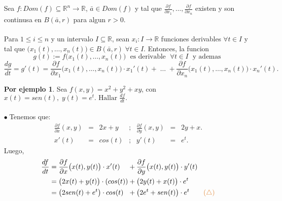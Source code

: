 \documentclass{article}
\theoremstyle{definition}
\newtheorem*{ej}{Por ejemplo}
\theoremstyle{remark}
\newcommand\bl{$\bullet\;$}
\begin{document}
\begin{teo}
  Sea $f : Dom(f) \subseteq \mathbb{R}^n \to \mathbb{R}$, $\bar{a} \in Dom(f)$ y tal que $\frac{\partial f}{\partial x_1},\dots,\frac{\partial f}{\partial x_n}$ existen y son continusa en $B(\bar{a},r)$ para algun $r>0$.\\\\
  Para $1 \leq i \leq n$ y un intervalo $I \subseteq \mathbb{R}$, sean $x_i : I \to \mathbb{R}$ funciones derivables $\forall t \in I$ y tal que $\big(x_1(t),\dots,x_n(t)\big) \in B(\bar{a},r) \; \forall t \in I.$ Entonces, la funcion \[
    g(t) := f\big(x_1(t), \dots, x_n (t)\big) \; \text{ es derivable } \; \forall t \in I \; \text{ y ademas }
    \] \[
    \frac{dg}{dt}=g'(t)= \frac{\partial f}{\partial x_1}\big(x_1(t),\dots,x_n(t)\big)\cdot x_1'(t) + \;  \dots \; + \frac{\partial f}{\partial x_n}\big(x_1(t),\dots,x_n(t)\big)\cdot x_n'(t). 
  \]
\end{teo}
\begin{figure}[h]
\centering
\def\svgwidth{1.5\textwidth}
\makebox[\textwidth]{
}
\end{figure} \pagebreak
\begin{ej}
  Sea $f(x,y)=x^2+y^2+xy$, con \mbox{$x(t)=sen(t), \; y(t)=e^t. \text{ Hallar } \frac{df}{dt}.$}\\\\
  \bl Tenemos que:  $$\begin{array}{lclclcl}
      \frac{\partial f}{\partial x}(x,y) & = & 2x+y & ; & \frac{\partial f}{\partial y}(x,y) & = & 2y+x. \\
                                         x'(t) & = & cos(t) & ; & y'(t) & = &  e^t.
                                         \end{array}$$ Luego, \[ 
                                         \begin{alignedat}{10}
                                           \frac{df}{dt} & = \frac{\partial f }{\partial x} \big(x(t),y(t)\big) \cdot x'(t) && + \frac{\partial f }{\partial y} \big(x(t),y(t)\big) \cdot y'(t) \\ 
                                                         & = \big(2x(t)+y(t)\big) \cdot (cos(t)) && + \big(2y(t)+x(t)\big) \cdot e^t \\ 
                                                         & = \big(2sen(t)+e^t\big) \cdot cos(t) && + \big(2e^t+sen(t)\big)\cdot e^t \quad \quad \textcolor{rojop2}{(\triangle)}
                                         \end{alignedat}
                                       \]
                                    
\end{ej}
\end{document}
